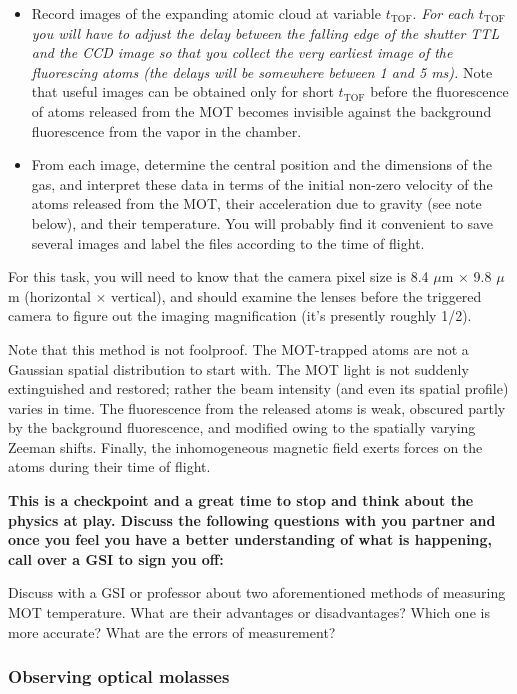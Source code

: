 \documentclass{../lab}
\begin{document}
\begin{itemize}
    \item Record images of the expanding atomic cloud at variable $t_\text{TOF}$. \emph{For each $t_\text{TOF}$ you will have to adjust the delay between the falling edge of the shutter TTL and the CCD image so that you collect the very earliest image of the fluorescing atoms (the delays will be somewhere between 1 and 5 ms).} Note that useful images can be obtained only for short $t_\text{TOF}$ before the fluorescence of atoms released from the MOT becomes invisible against the background fluorescence from the vapor in the chamber.

    \item From each image, determine the central position and the dimensions of the gas, and interpret these data in terms of the initial non-zero velocity of the atoms released from the MOT, their acceleration due to gravity (see note below), and their temperature. You will probably find it convenient to save several images and label the files according to the time of flight.
\end{itemize}

For this task, you will need to know that the camera pixel size is 8.4 $\mu$m $\times$ 9.8 $\mu$m (horizontal $\times$ vertical), and should examine the lenses before the triggered camera to figure out the imaging magnification (it's presently roughly 1/2).

Note that this method is not foolproof. The MOT-trapped atoms are not a Gaussian spatial distribution to start with. The MOT light is not suddenly extinguished and restored; rather the beam intensity (and even its spatial profile) varies in time. The fluorescence from the released atoms is weak, obscured partly by the background fluorescence, and modified owing to the spatially varying Zeeman shifts. Finally, the inhomogeneous magnetic field exerts forces on the atoms during their time of flight.

\textbf{This is a checkpoint and a great time to stop and think about the physics at play. Discuss the following questions with you partner and once you feel you have a better understanding of what is happening, call over a GSI to sign you off:}

Discuss with a GSI or professor about two aforementioned methods of measuring MOT temperature. What are their advantages or disadvantages? Which one is more accurate? What are the errors of measurement?

\subsubsection{Observing optical molasses}
\end{document}

